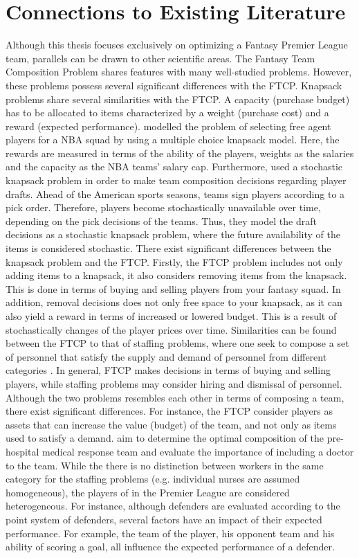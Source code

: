 \section{Connections to Existing Literature}\label{Other_Relevant_Research}
Although this thesis focuses exclusively on optimizing a Fantasy Premier League team, parallels can be drawn to other scientific areas. The Fantasy Team Composition Problem shares features with many well-studied problems. However, these problems possess several significant differences with the FTCP. 
\newpar
Knapsack problems share several similarities with the FTCP. A capacity (purchase budget) has to be allocated to items characterized by a weight (purchase cost) and a reward (expected performance). \cite{Kirshner} modelled the problem of selecting free agent players for a NBA squad by using a multiple choice knapsack model. Here, the rewards are measured in terms of the ability of the players, weights as the salaries and the capacity as the NBA teams' salary cap. Furthermore, \cite{Gibson} used a stochastic knapsack problem in order to make team composition decisions regarding player drafts. 
Ahead of the American sports seasons, teams sign players according to a pick order. Therefore, players become stochastically unavailable over time, depending on the pick decisions of the teams. Thus, they model the draft decisions as a stochastic knapsack problem, where the future availability of the items is considered stochastic. There exist significant differences between the knapsack problem and the FTCP. Firstly, the FTCP problem includes not only adding items to a knapsack, it also considers removing items from the knapsack. This is done in terms of buying and selling players from your fantasy squad. In addition, removal decisions does not only free space to your knapsack, as it can also yield a reward in terms of increased or lowered budget. This is a result of stochastically changes of the player prices over time. 
\newpar
Similarities can be found between the FTCP to that of staffing problems, where one seek to compose a set of personnel that satisfy the supply and demand of personnel from different categories \citep{Komarudin,Bruecker}. In general, FTCP makes decisions in terms of buying and selling players, while staffing problems may consider hiring and dismissal of personnel. Although the two problems resembles each other in terms of composing a team, there exist significant differences. For instance, the FTCP consider players as assets that can increase the value (budget) of the team, and not only as items used to satisfy a demand. \cite{Davis} aim to determine the optimal composition of the pre-hospital medical response team and evaluate the importance of including a doctor to the team. While the there is no distinction between workers in the same category for the staffing problems (e.g. individual nurses are assumed homogeneous), the players of in the Premier League are considered heterogeneous. For instance, although defenders are evaluated according to the point system of defenders, several factors have an impact of their expected performance. For example, the team of the player, his opponent team and his ability of scoring a goal, all influence the expected performance of a defender. 
